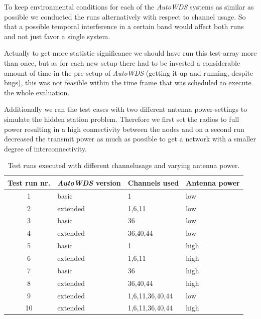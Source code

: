     To keep environmental conditions for each of the \textit{AutoWDS} systems as similar as possible we conducted the runs alternatively with respect to channel usage.
    So that a possible temporal interference in a certain band would affect both runs and not just favor a single system.
  
    Actually to get more statistic significance we should have run this test-array more than once, but as for each new setup there had to 
    be invested a considerable amount of time in the pre-setup of \textit{AutoWDS} (getting it up and running, despite bugs), 
    this was not feasible within the time frame that was scheduled to execute the whole evaluation.
    
    Additionally we ran the test cases with two different antenna power-settings to simulate the hidden station problem. 
    Therefore we first set the radios to full power resulting in a high connectivity between the nodes and on a second 
    run decreased the transmit power as much as possible to get a network with a smaller degree of interconnectivity.
  
    \begin{table}[h!]
      \centering
      \begin{tabular}{clll}
	Test run nr. & \textit{AutoWDS} version & Channels used & Antenna power\\ \hline
	1 & basic & 1 & low \\
	2 & extended & 1,6,11 & low \\
	3 & basic & 36 & low \\
	4 & extended & 36,40,44 & low \\
	5 & basic & 1 & high \\
	6 & extended & 1,6,11 & high \\
	7 & basic & 36 & high \\
	8 & extended & 36,40,44 & high \\
	9 & extended & 1,6,11,36,40,44 & low \\
	10 & extended & 1,6,11,36,40,44 & high \\
      \end{tabular}
      \caption{Test runs executed with different channelusage and varying antenna power.}
      \label{tab:testruns}
    \end{table}
    
\newpage
    
